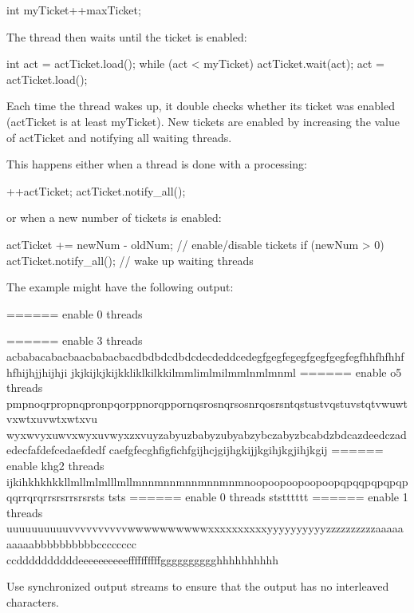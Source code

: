 \begin{cpp}
int myTicket{++maxTicket};
\end{cpp}

The thread then waits until the ticket is enabled:

\begin{cpp}
int act = actTicket.load();
while (act < myTicket) {
	actTicket.wait(act);
	act = actTicket.load();
}
\end{cpp}

Each time the thread wakes up, it double checks whether its ticket was enabled (actTicket is at least myTicket). New tickets are enabled by increasing the value of actTicket and notifying all waiting threads.

This happens either when a thread is done with a processing:

\begin{cpp}
++actTicket;
actTicket.notify_all();
\end{cpp}

or when a new number of tickets is enabled:

\begin{cpp}
actTicket += newNum - oldNum; // enable/disable tickets
if (newNum > 0) actTicket.notify_all(); // wake up waiting threads
\end{cpp}

The example might have the following output:

\begin{shell}
====== enable 0 threads

====== enable 3 threads
acbabacabacbaacbabacbacdbdbdcdbdcdecdeddcedegfgegfegegfgegfgegfegfhhfhfhhfhfhijhjjhijhji
jkjkijkjkijkkliklkilkkilmmlimlmilmmlnmlmnml
====== enable o5 threads
pmpnoqrpropnqpronpqorppnorqppornqsrosnqrsosnrqosrsntqstustvqstuvstqtvwuwtvxwtxuvwtxwtxvu
wyxwvyxuwvxwyxuvwyxzxvuyzabyuzbabyzubyabzybczabyzbcabdzbdcazdeedczadedecfafdefcedaefdedf
caefgfecghfigfichfgijhcjgijhgkijjkgihjkgjihjkgij
====== enable khg2 threads
ijkihkhkhkkllmllmlmlllmllmnnmnnmnnmnnmnmnoopoopoopoopoopqpqqpqpqpqpqqrrqrqrrsrsrrsrsrsts
tsts
====== enable 0 threads
ststttttt
====== enable 1 threads
uuuuuuuuuuvvvvvvvvvvwwwwwwwwwwxxxxxxxxxxyyyyyyyyyyzzzzzzzzzzaaaaaaaaaabbbbbbbbbbcccccccc
ccddddddddddeeeeeeeeeeffffffffffgggggggggghhhhhhhhhh
\end{shell}

Use synchronized output streams to ensure that the output has no interleaved characters.


